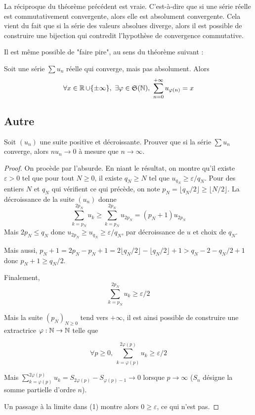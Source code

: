 \documentclass[10pt]{scrartcl}
\begin{document}
    La réciproque du théorème précédent est vraie. 
    C'est-à-dire que si une série réelle est commutativement convergente, alors elle est absolument convergente. 
    Cela vient du fait que si la série des valeurs absolues diverge, alors il est possible de construire une bijection qui contredit l'hypothèse de convergence commutative.

    Il est même possible de "faire pire", au sens du théorème suivant : 
    \begin{thm}[de Riemann]
        Soit une série $\sum u_n$ réelle qui converge, mais pas absolument.
        Alors 
        \[
            \forall x\in\R\cup\lbrace\pm\infty\rbrace,\ \exists\varphi\in\mathfrak S(\N),\ \sum_{n=0}^{+\infty}u_{\varphi(n)}=x
        \]
    \end{thm}

    \subsection*{Autre}
    \begin{exo}
        Soit $(u_n)$ une suite positive et décroissante. Prouver que si la série $\sum u_n$ converge, alors $nu_n\to 0$ à mesure que $n\to\infty$.
    \end{exo}

    \begin{proof}
        On procède par l'absurde. 
        En niant le résultat, on montre qu'il existe $\varepsilon>0$ tel que pour tout $N\geq 0$, il existe $q_N\geq N$ tel que $u_{q_N}\geq \varepsilon/q_N$.
        Pour des entiers $N$ et $q_N$ qui vérifient ce qui précède, on note $p_N=\lfloor q_N/2\rfloor\geq\lfloor N/2\rfloor$. 
        La décroissance de la suite $(u_n)$ donne
        \[
            \sum_{k=p_N}^{2p_N}u_k\geq  \sum_{k=p_N}^{2p_N}u_{2p_N}=(p_N+1)u_{2p_N}
        \]
        Mais $2p_N\leq q_N$ donc $u_{2p_N}\geq u_{q_N}\geq \varepsilon/q_N$, par décroissance de $u$ et choix de $q_N$.

        Mais aussi, $p_N+1=2p_N-p_N+1=2\lfloor q_N/2\rfloor -\lfloor q_N/2\rfloor+1> q_N-2-q_N/2+1$ donc $p_N+1\geq q_N/2$. 
        
        Finalement,
        \[
            \sum_{k=p_N}^{2p_N}u_k\geq \varepsilon/2
        \]

        Mais la suite $(p_N)_{N\geq 0}$ tend vers $+\infty$, il est ainsi possible de construire une extractrice $\varphi:\operatorname{\mathbb N}\to\operatorname{\mathbb N}$ telle que 

        \[
            \forall p\geq 0,\ \sum_{k=\varphi(p)}^{2\varphi(p)}u_k\geq \varepsilon/2\tag*{(1)}
        \]

        Mais $\sum_{k=\varphi(p)}^{2\varphi(p)}u_k=S_{2\varphi(p)}-S_{\varphi(p)-1}\to 0$ lorsque $p\to\infty$ ($S_n$ désigne la somme partielle d'ordre $n$).

        Un passage à la limite dans (1) montre alors $0\geq \varepsilon$, ce qui n'est pas.

    \end{proof}
\end{document}
